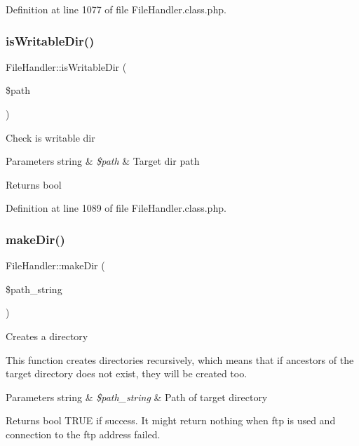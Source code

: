 Definition at line 1077 of file File\+Handler.\+class.\+php.

\mbox{\label{classFileHandler_a9494e34a28f27b6a1ab2e032aada2bbb}} 
\subsubsection{\texorpdfstring{is\+Writable\+Dir()}{isWritableDir()}}
{\footnotesize\ttfamily File\+Handler\+::is\+Writable\+Dir (\begin{DoxyParamCaption}\item[{}]{\$path }\end{DoxyParamCaption})}

Check is writable dir


\begin{DoxyParams}[1]{Parameters}
string & {\em \$path} & Target dir path \\
\hline
\end{DoxyParams}
\begin{DoxyReturn}{Returns}
bool 
\end{DoxyReturn}


Definition at line 1089 of file File\+Handler.\+class.\+php.

\mbox{\label{classFileHandler_a9c2502d10c34a3996f1d6927624a7824}} 
\subsubsection{\texorpdfstring{make\+Dir()}{makeDir()}}
{\footnotesize\ttfamily File\+Handler\+::make\+Dir (\begin{DoxyParamCaption}\item[{}]{\$path\+\_\+string }\end{DoxyParamCaption})}

Creates a directory

This function creates directories recursively, which means that if ancestors of the target directory does not exist, they will be created too.


\begin{DoxyParams}[1]{Parameters}
string & {\em \$path\+\_\+string} & Path of target directory \\
\hline
\end{DoxyParams}
\begin{DoxyReturn}{Returns}
bool T\+R\+UE if success. It might return nothing when ftp is used and connection to the ftp address failed. 
\end{DoxyReturn}


